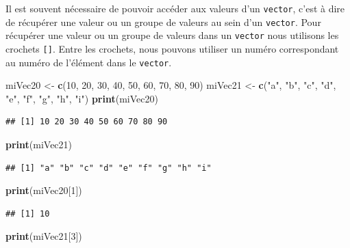 \documentclass[twoside,symmetric]{book}
\newenvironment{Shaded}{}{}
\newcommand{\DecValTok}[1]{#1}
\newcommand{\KeywordTok}[1]{\textbf{#1}}
\newcommand{\NormalTok}[1]{#1}
\newcommand{\StringTok}[1]{#1}
\begin{document}
Il est souvent nécessaire de pouvoir accéder aux valeurs d'un \texttt{vector}, c'est à dire de récupérer une valeur ou un groupe de valeurs au sein d'un \texttt{vector}. Pour récupérer une valeur ou un groupe de valeurs dans un \texttt{vector} nous utilisons les crochets \texttt{{[}{]}}. Entre les crochets, nous pouvons utiliser un numéro correspondant au numéro de l'élément dans le \texttt{vector}.

\begin{Shaded}
\begin{Highlighting}[]
\NormalTok{miVec20 <-}\StringTok{ }\KeywordTok{c}\NormalTok{(}\DecValTok{10}\NormalTok{, }\DecValTok{20}\NormalTok{, }\DecValTok{30}\NormalTok{, }\DecValTok{40}\NormalTok{, }\DecValTok{50}\NormalTok{, }\DecValTok{60}\NormalTok{, }\DecValTok{70}\NormalTok{, }\DecValTok{80}\NormalTok{, }\DecValTok{90}\NormalTok{)}
\NormalTok{miVec21 <-}\StringTok{ }\KeywordTok{c}\NormalTok{(}\StringTok{"a"}\NormalTok{, }\StringTok{"b"}\NormalTok{, }\StringTok{"c"}\NormalTok{, }\StringTok{"d"}\NormalTok{, }\StringTok{"e"}\NormalTok{, }\StringTok{"f"}\NormalTok{, }\StringTok{"g"}\NormalTok{, }\StringTok{"h"}\NormalTok{, }\StringTok{"i"}\NormalTok{)}
\KeywordTok{print}\NormalTok{(miVec20)}
\end{Highlighting}
\end{Shaded}

\begin{verbatim}
## [1] 10 20 30 40 50 60 70 80 90
\end{verbatim}

\begin{Shaded}
\begin{Highlighting}[]
\KeywordTok{print}\NormalTok{(miVec21)}
\end{Highlighting}
\end{Shaded}

\begin{verbatim}
## [1] "a" "b" "c" "d" "e" "f" "g" "h" "i"
\end{verbatim}

\begin{Shaded}
\begin{Highlighting}[]
\KeywordTok{print}\NormalTok{(miVec20[}\DecValTok{1}\NormalTok{])}
\end{Highlighting}
\end{Shaded}

\begin{verbatim}
## [1] 10
\end{verbatim}

\begin{Shaded}
\begin{Highlighting}[]
\KeywordTok{print}\NormalTok{(miVec21[}\DecValTok{3}\NormalTok{])}
\end{Highlighting}
\end{Shaded}
\end{document}
